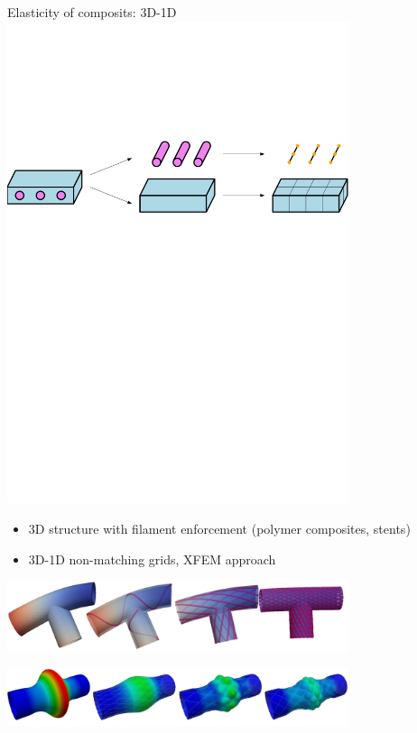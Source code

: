 \documentclass[10pt]{beamer} %
\begin{document}
\begin{frame}{Elasticity of composits: 3D-1D}
\includegraphics[width=10cm]{graphics-js/matrix-fibers}
\begin{itemize}
\item 3D structure with filament enforcement (polymer composites, stents)
\item 3D-1D non-matching grids, XFEM approach
\end{itemize}

\includegraphics[width=10cm]{graphics-js/T-bend}

\includegraphics[width=10cm]{graphics-js/pipes}
\end{frame}
\end{document}
